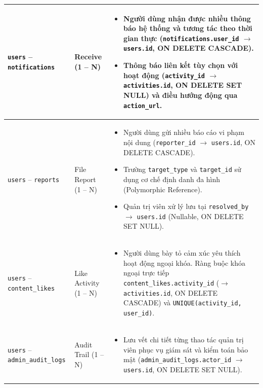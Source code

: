 \begin{longtable}{|p{}|p{}|p{}|}
    \texttt{users} -- \texttt{notifications} & Receive \newline (1 -- N) & 
    \begin{itemize}
        \item Người dùng nhận được nhiều thông báo hệ thống và tương tác theo thời gian thực (\texttt{notifications.user\_id} $\rightarrow$ \texttt{users.id}, ON DELETE CASCADE).
        \item Thông báo liên kết tùy chọn với hoạt động (\texttt{activity\_id} $\rightarrow$ \texttt{activities.id}, ON DELETE SET NULL) và điều hướng động qua \texttt{action\_url}.
    \end{itemize} \\ \hline

    \texttt{users} -- \texttt{reports} & File Report \newline (1 -- N) & 
    \begin{itemize}
        \item Người dùng gửi nhiều báo cáo vi phạm nội dung (\texttt{reporter\_id} $\rightarrow$ \texttt{users.id}, ON DELETE CASCADE).
        \item Trường \texttt{target\_type} và \texttt{target\_id} sử dụng cơ chế định danh đa hình (Polymorphic Reference).
        \item Quản trị viên xử lý lưu tại \texttt{resolved\_by} $\rightarrow$ \texttt{users.id} (Nullable, ON DELETE SET NULL).
    \end{itemize} \\ \hline

    \texttt{users} -- \texttt{content\_likes} & Like Activity \newline (1 -- N) & 
    \begin{itemize}
        \item Người dùng bày tỏ cảm xúc yêu thích hoạt động ngoại khóa. Ràng buộc khóa ngoại trực tiếp \texttt{content\_likes.activity\_id} ($\rightarrow$ \texttt{activities.id}, ON DELETE CASCADE) và \texttt{UNIQUE(activity\_id, user\_id)}.
    \end{itemize} \\ \hline

    \texttt{users} -- \texttt{admin\_audit\_logs} & Audit Trail \newline (1 -- N) & 
    \begin{itemize}
        \item Lưu vết chi tiết từng thao tác quản trị viên phục vụ giám sát và kiểm toán bảo mật (\texttt{admin\_audit\_logs.actor\_id} $\rightarrow$ \texttt{users.id}, ON DELETE SET NULL).
    \end{itemize} \\ \hline
\end{longtable}

